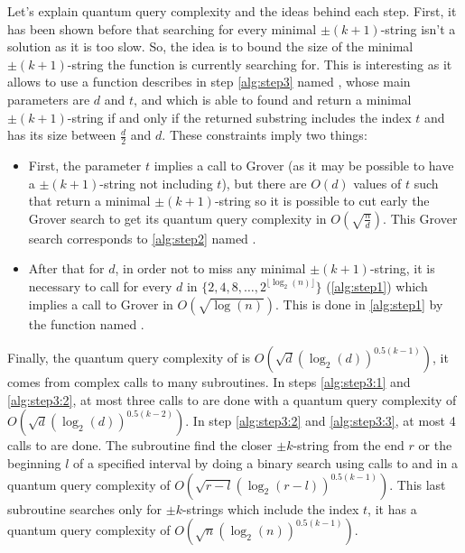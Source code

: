 \begin{itemize}
          Let's explain quantum query complexity and the ideas behind
          each step. First, it has been shown before that searching for
          every minimal $\pm(k+1)$-string isn't a solution as it is too
          slow. So, the idea is to bound the size of the minimal
          $\pm(k+1)$-string the function is currently searching for.
          This is interesting as it allows to use a function describes
          in step \ref{alg:step3} named , whose main parameters
          are $d$ and $t$, and which is able to found and return a minimal
          $\pm(k+1)$-string if and only if the returned substring includes
          the index $t$ and has its size between $\frac{d}{2}$ and $d$.
          These constraints imply two things:
          \begin{itemize}
              \item First, the parameter $t$ implies a call to Grover (as it may be possible to have a $\pm(k+1)$-string  not including $t$), but
                    there are $O(d)$ values of $t$ such that  return a minimal $\pm(k+1)$-string so it is possible
                    to cut early the Grover search to get its quantum query complexity in $O\left(\sqrt{\frac{n}{d}}\right)$.
                    This Grover search corresponds to \autoref{alg:step2} named .
              \item After that for $d$, in order not to miss any minimal $\pm(k+1)$-string, it is necessary to call 
                    for every $d$ in $\{2, 4, 8, \ldots, 2^{\lfloor \log_2(n) \rfloor}\}$ (\autoref{alg:step1}) which implies a
                    call to Grover in $O\left(\sqrt{\log(n)}\right)$. This is done in \autoref{alg:step1} by the function named
                    .
          \end{itemize}
          Finally, the quantum query complexity of  is
          $O\left(\sqrt{d}(\log_2(d))^{0.5(k-1)}\right)$, it comes from
          complex calls to many subroutines. In steps \ref{alg:step3:1} and
          \ref{alg:step3:2}, at most three calls to  are done with
          a quantum query complexity of
          $O\left(\sqrt{d}(\log_2(d))^{0.5(k-2)}\right)$. In step
          \ref{alg:step3:2} and \ref{alg:step3:3}, at most 4 calls to
           are done. The subroutine  find the closer
          $\pm k$-string from the end $r$ or the beginning $l$ of a
          specified interval by doing a binary search using calls to
           and  in a quantum query complexity of
          $O\left(\sqrt{r-l}(\log_2(r-l))^{0.5(k-1)}\right)$.
          This last subroutine  searches only for $\pm k$-strings
          which include the index $t$, it has a quantum query complexity of
          $O\left(\sqrt{n}(\log_2(n))^{0.5(k-1)}\right)$.


\end{itemize}
